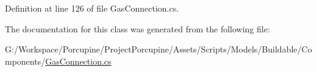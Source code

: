 Definition at line 126 of file Gas\+Connection.\+cs.



The documentation for this class was generated from the following file\+:\begin{DoxyCompactItemize}
\item 
G\+:/\+Workspace/\+Porcupine/\+Project\+Porcupine/\+Assets/\+Scripts/\+Models/\+Buildable/\+Components/\hyperlink{_gas_connection_8cs}{Gas\+Connection.\+cs}\end{DoxyCompactItemize}
